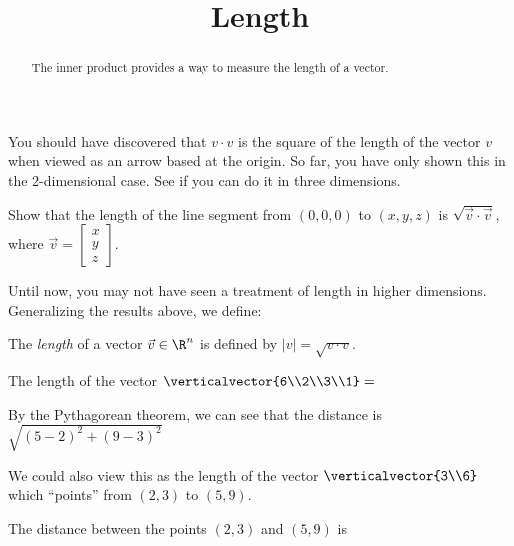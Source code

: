 \documentclass{ximera}
\title{Length}
\begin{document}
\begin{abstract}
  The inner product provides a way to measure the length of a vector.
\end{abstract}

You should have discovered that $v\cdot v$ is the square of the length
of the vector $v$ when viewed as an arrow based at the origin.  So
far, you have only shown this in the $2$-dimensional case.  See if you
can do it in three dimensions.

Show that the length of the line segment from $(0,0,0)$ to $(x,y,z)$
is $\sqrt{\vec{v} \cdot \vec{v}}$, where $\vec{v} = \begin{bmatrix} x
  \\ y \\ z\end{bmatrix}$.

\begin{free-response}
  
\end{free-response}

Until now, you may not have seen a treatment of length in higher
dimensions.  Generalizing the results above, we define:

\begin{definition}
  The \textit{length} of a vector $\vec{v} \in \R^n$ is defined by $|v| = \sqrt{v \cdot v}$.
\end{definition}

\begin{question}
  \begin{solution}
    The length of the vector $\verticalvector{6\\2\\3\\1}=$ 
  \end{solution}
\end{question}

\begin{question}
  \begin{solution}
    \begin{hint}
      By the Pythagorean theorem, we can see that  the distance is $\sqrt{(5-2)^2+(9-3)^2}$
    \end{hint}
    \begin{hint}
      We could also view this as the length of the vector $\verticalvector{3\\6}$ which ``points'' from $(2,3)$ to $(5,9)$.
    \end{hint}
    The distance between the points $(2,3)$ and $(5,9)$ is 
  \end{solution}
\end{question}
\end{document}
